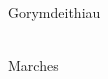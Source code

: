 \begin{multicols}{2}
    \Huge{Gorymdeithiau}\\
    \vspace{1cm}\\
    \normalsize{
      \noindent 
      \blindtext
    }

    \newcolumn

    \Huge{Marches}\\
    \vspace{1cm}\\
    \normalsize{
      \noindent
      \blindtext
    }

    \end{multicols}